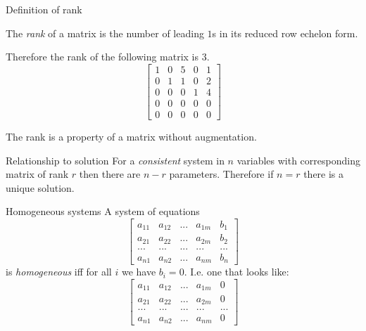 \documentclass{beamer}
\begin{document}
\begin{frame}{Definition of rank}
  \begin{definition}
    The \emph{rank} of a matrix is the number of leading $1$s in its reduced row echelon form.
  \end{definition}
  \begin{example}
    Therefore the rank of the following matrix is $3$.
    \begin{equation*}
      \left[\begin{array}{rrrrr}
              1 & 0 & 5 & 0 & 1  \\
              0 & 1 & 1 & 0 & 2  \\
              0 & 0 & 0 & 1 & 4 \\
              0 & 0 & 0 & 0 & 0 \\
              0 & 0 & 0 & 0 & 0 
            \end{array}\right] 
        \end{equation*}
      \end{example}
      The rank is a property of a matrix without augmentation.
\end{frame}

\begin{frame}{Relationship to solution}
  For a \emph{consistent} system in $n$ variables with corresponding matrix of rank $r$ then there are $n-r$ parameters.\vfill
  Therefore if $n=r$ there is a unique solution.
\end{frame}

\begin{frame}{Homogeneous systems}
  A system of equations
  \begin{equation*}
      \left[
        \begin{array}{rrrr|r}
          a_{11} & a_{12} & ... & a_{1m} & b_1\\
          a_{21} & a_{22} & ... & a_{2m} & b_2\\
          ... & ... & ... & ... & ...\\
          a_{n1} & a_{n2} & ... & a_{nm} & b_n
        \end{array}
      \right] 
    \end{equation*}
    is \emph{homogeneous} iff for all $i$ we have $b_i = 0$.
    I.e. one that looks like:
    \begin{equation*}
      \left[
        \begin{array}{rrrr|r}
          a_{11} & a_{12} & ... & a_{1m} & 0\\
          a_{21} & a_{22} & ... & a_{2m} & 0\\
          ... & ... & ... & ... & ...\\
          a_{n1} & a_{n2} & ... & a_{nm} & 0
        \end{array}
      \right] 
    \end{equation*}
\end{frame}
\end{document}
